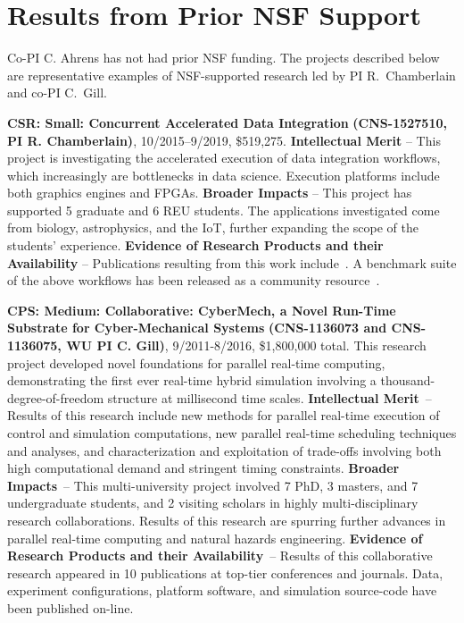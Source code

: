 \section{Results from Prior NSF Support}
\label{sec:prior}

Co-PI C. Ahrens has not had prior NSF funding. The projects described
below are representative examples of NSF-supported research led by PI 
R.~Chamberlain and co-PI C.~Gill.

{\large\bf CSR: Small: Concurrent Accelerated Data Integration}
{\bf (CNS-1527510,
PI R. Chamberlain)}, 
10/2015--9/2019, \$519,275.  
%
\textbf{Intellectual Merit} -- This project is investigating the
accelerated execution of data integration workflows, which
increasingly are bottlenecks in data science. Execution platforms
include both graphics engines and FPGAs.
%
\textbf{Broader Impacts} -- This project has supported 5
graduate and 6 REU students.  The applications investigated
come from biology, astrophysics, and the IoT,
further expanding the scope of the students'
experience.
%
\textbf{Evidence of Research Products and their Availability} --
Publications resulting from this work include~\cite{cc19,dibs,c17,fcbmc19,mgc16,js16}.
A benchmark suite of the above workflows has been released
as a community resource~\cite{dibsv1}.

{\large\bf CPS: Medium: Collaborative: CyberMech, a Novel Run-Time Substrate for 
Cyber-Mechanical Systems}
{\bf (CNS-1136073 and CNS-1136075,
WU PI C. Gill)}, 9/2011-8/2016, \$1,800,000 total.  
%
This research project developed novel foundations for parallel real-time computing, demonstrating the first ever real-time hybrid simulation involving a thousand-degree-of-freedom structure at millisecond time scales.
%
\textbf{Intellectual Merit}~-- Results of this research include new methods for parallel real-time execution of control and simulation computations, new parallel real-time scheduling techniques and analyses, and characterization and exploitation of trade-offs involving both high computational demand and stringent timing constraints.
%
\textbf{Broader Impacts}~-- This multi-university project involved 7 PhD, 3 masters, and 7 undergraduate students, and 2 visiting scholars in highly multi-disciplinary research collaborations.  Results of this research are spurring
further advances in parallel real-time computing and natural hazards
engineering.
%
\textbf{Evidence of Research Products and their Availability}~-- Results of
this 
collaborative research appeared in 10 publications at
top-tier conferences and journals.
Data, experiment configurations, platform software, and simulation source-code 
have been published on-line. %

